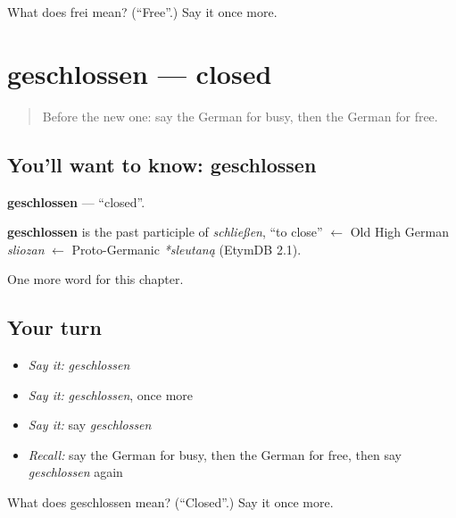 \begin{tcolorbox}[breakable,colback=teal!4,colframe=teal!35!black,title={Before you move on}]
What does frei mean? (\textquotedblleft{}Free\textquotedblright{}.) Say it once more.
\end{tcolorbox}
\section[geschlossen]{geschlossen — closed}

\label{lesson:GE-C131-geschlossen}



\begin{quote}
Before the new one: say the German for busy, then the German for free.
\end{quote}

\subsection*{You'll want to know: geschlossen}
\textbf{geschlossen} — \textquotedblleft{}closed\textquotedblright{}.

\begin{cousinweb}
\textbf{geschlossen} is the past participle of \emph{schließen}, \textquotedblleft{}to close\textquotedblright{} $\leftarrow$ Old High German \emph{sliozan} $\leftarrow$ Proto-Germanic \emph{*sleutaną} (EtymDB 2.1).
\end{cousinweb}

\begin{grammarlens}[title={What you've built}]
One more word for this chapter.
\end{grammarlens}

\subsection*{Your turn}
\begin{itemize}
\raggedright
  \item \emph{Say it:} \emph{geschlossen}
  \item \emph{Say it:} \emph{geschlossen}, once more
  \item \emph{Say it:} say \emph{geschlossen}
  \item \emph{Recall:} say the German for busy, then the German for free, then say \emph{geschlossen} again
\end{itemize}

\begin{tcolorbox}[breakable,colback=teal!4,colframe=teal!35!black,title={Before you move on}]
What does geschlossen mean? (\textquotedblleft{}Closed\textquotedblright{}.) Say it once more.
\end{tcolorbox}
